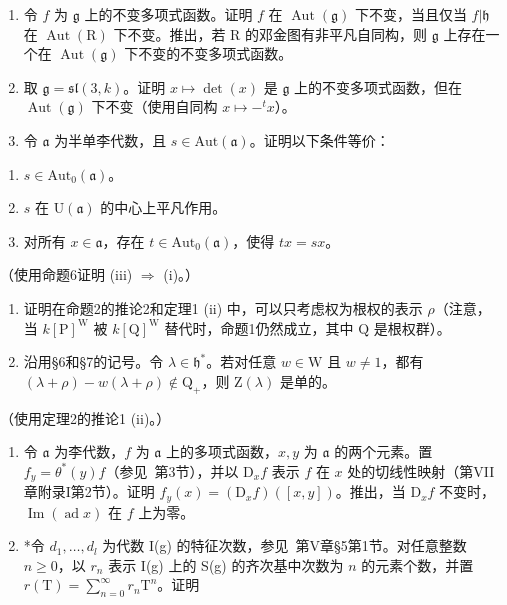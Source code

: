 
\begin{enumerate}
\def\labelenumi{\arabic{enumi})}
\item
  令 \(f\) 为 \(\mathfrak{g}\) 上的不变多项式函数。证明 \(f\) 在 \(\operatorname{Aut}(\mathfrak{g})\) 下不变，当且仅当 \(f|\mathfrak{h}\) 在 \(\operatorname{Aut}(\mathrm{R})\) 下不变。推出，若 \(\mathrm{R}\) 的邓金图有非平凡自同构，则 \(\mathfrak{g}\) 上存在一个在 \(\operatorname{Aut}(\mathfrak{g})\) 下不变的不变多项式函数。
\item
  取 \(\mathfrak{g} = \mathfrak{sl}(3,k)\)。证明 \(x\mapsto \det (x)\) 是 \(\mathfrak{g}\) 上的不变多项式函数，但在 \(\operatorname {Aut}(\mathfrak{g})\) 下不变（使用自同构 \(x\mapsto -^t x\)）。
\item
  令 \(\mathfrak{a}\) 为半单李代数，且 \(s\in \mathrm{Aut}(\mathfrak{a})\)。证明以下条件等价：
\end{enumerate}

\begin{enumerate}
\def\labelenumi{(\roman{enumi})}
\item
  \(s \in \text{Aut}_{0}(\mathfrak{a})\)。
\item
  \(s\) 在 \(\mathrm{U}(\mathfrak{a})\) 的中心上平凡作用。
\item
  对所有 \(x \in \mathfrak{a}\)，存在 \(t \in \mathrm{Aut}_0(\mathfrak{a})\)，使得 \(tx = sx\)。
\end{enumerate}

（使用命题6证明 (iii) \(\Longrightarrow\) (i)。）

\begin{enumerate}
\def\labelenumi{\arabic{enumi})}
\setcounter{enumi}{3}
\item
  证明在命题2的推论2和定理1 (ii) 中，可以只考虑权为根权的表示 \(\rho\)（注意，当 \(k[\mathrm{P}]^{\mathrm{W}}\) 被 \(k[\mathrm{Q}]^{\mathrm{W}}\) 替代时，命题1仍然成立，其中 \(\mathrm{Q}\) 是根权群）。
\item
  沿用§6和§7的记号。令 \(\lambda \in \mathfrak{h}^*\)。若对任意 \(w \in \mathrm{W}\) 且 \(w \neq 1\)，都有 \((\lambda + \rho) - w(\lambda + \rho) \notin \mathrm{Q}_+\)，则 \(\mathrm{Z}(\lambda)\) 是单的。
\end{enumerate}

（使用定理2的推论1 (ii)。）

\begin{enumerate}
\def\labelenumi{\arabic{enumi})}
\setcounter{enumi}{5}
\item
  令 \(\mathfrak{a}\) 为李代数，\(f\) 为 \(\mathfrak{a}\) 上的多项式函数，\(x, y\) 为 \(\mathfrak{a}\) 的两个元素。置 \(f_y = \theta^*(y)f\)（参见~第3节），并以 \(\mathrm{D}_x f\) 表示 \(f\) 在 \(x\) 处的切线性映射（第VII章附录I第2节）。证明 \(f_y(x) = (\mathrm{D}_xf)([x,y])\)。推出，当 \(\mathrm{D}_xf\) 不变时，\(\operatorname{Im}(\operatorname{ad}x)\) 在 \(f\) 上为零。
\item
  *令 \(d_1, \ldots, d_l\) 为代数 I(g) 的特征次数，参见~第V章§5第1节。对任意整数 \(n \geq 0\)，以 \(r_n\) 表示 I(g) 上的 S(g) 的齐次基中次数为 \(n\) 的元素个数，并置 \(r(\mathrm{T}) = \sum_{n=0}^{\infty} r_n \mathrm{T}^n\)。证明
\end{enumerate}

